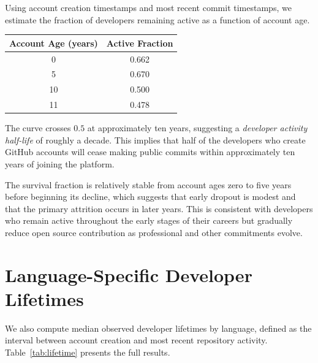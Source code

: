 \documentclass[12pt,a4paper]{article}
\begin{document}
Using account creation timestamps and most recent commit timestamps, we estimate
the fraction of developers remaining active as a function of account age.

\begin{center}
\begin{tabular}{cc}
\toprule
Account Age (years) & Active Fraction \\
\midrule
0  & 0.662 \\
5  & 0.670 \\
10 & 0.500 \\
11 & 0.478 \\
\bottomrule
\end{tabular}
\end{center}

The curve crosses $0.5$ at approximately ten years, suggesting a
\emph{developer activity half-life} of roughly a decade. This implies that half
of the developers who create GitHub accounts will cease making public commits
within approximately ten years of joining the platform.

The survival fraction is relatively stable from account ages zero to five years
before beginning its decline, which suggests that early dropout is modest and
that the primary attrition occurs in later years. This is consistent with
developers who remain active throughout the early stages of their careers but
gradually reduce open source contribution as professional and other commitments
evolve.

\section{Language-Specific Developer Lifetimes}

We also compute median observed developer lifetimes by language, defined as the
interval between account creation and most recent repository activity.
Table~\ref{tab:lifetime} presents the full results.
\end{document}
